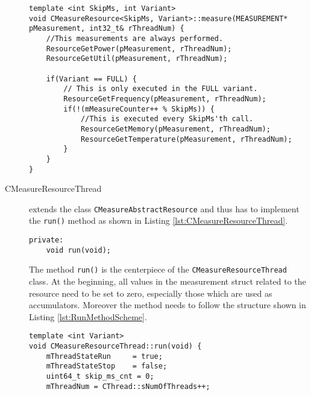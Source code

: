 \begin{description}
	\begin{lstlisting}[caption={\added[id=ck]{Abstract minimal example for the \texttt{measure()} method of the \texttt{CMeasureResource} class to clarify the use of the templates.}\added[id=al]{Im generischen Text oben, wird das eben nicht clarified.}}, label=lst:CMeasureResourceMeasure]
template <int SkipMs, int Variant>
void CMeasureResource<SkipMs, Variant>::measure(MEASUREMENT* pMeasurement, int32_t& rThreadNum) {
	//This measurements are always performed.
	ResourceGetPower(pMeasurement, rThreadNum);
	ResourceGetUtil(pMeasurement, rThreadNum);

	if(Variant == FULL) {
		// This is only executed in the FULL variant.
		ResourceGetFrequency(pMeasurement, rThreadNum);
		if(!(mMeasureCounter++ % SkipMs)) {
			//This is executed every SkipMs'th call. 
			ResourceGetMemory(pMeasurement, rThreadNum);
			ResourceGetTemperature(pMeasurement, rThreadNum);
		}
	}
}
	\end{lstlisting}
	 
	\item[CMeasureResourceThread] extends the class \texttt{CMeasureAbstractResource} and thus has to implement the \texttt{run()} method as shown in Listing \ref{lst:CMeasureResourceThread}. 
	\begin{lstlisting}[caption={Methods of the \texttt{CMeasureResourceThread} class that programmers have to implement in order to support a new resource.}, label=lst:CMeasureResourceThread]
private:
	void run(void);
	\end{lstlisting}
	The method \texttt{run()} is the centerpiece of the \texttt{CMeasureResourceThread} class. At the beginning, all values in the measurement struct related to the resource need to be set to zero, especially those which are used as accumulators. Moreover the method needs to follow the structure shown in Listing \ref{lst:RunMethodScheme}.
	
\pagebreak
\vspace*{-2.6cm}

\begin{lstlisting}[caption={Scheme of the \texttt{run()} method that each \texttt{CMeasureResourceThread} must have. \added[id=ck]{Listing aktualisiert}}, label=lst:RunMethodScheme]
template <int Variant>
void CMeasureResourceThread::run(void) {
	mThreadStateRun		= true;
	mThreadStateStop	= false;
	uint64_t skip_ms_cnt = 0;
	mThreadNum = CThread::sNumOfThreads++;
	

\end{lstlisting}
\end{description}

